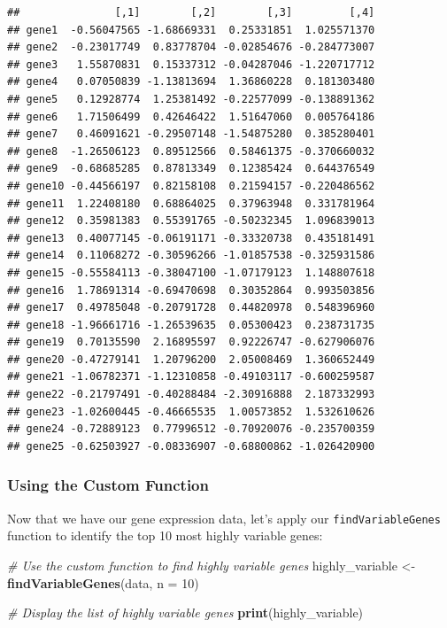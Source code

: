 \documentclass[
]{book}
\newenvironment{Shaded}{\begin{snugshade}}{\end{snugshade}}
\newcommand{\AttributeTok}[1]{\textcolor[rgb]{0.13,0.29,0.53}{#1}}
\newcommand{\CommentTok}[1]{\textcolor[rgb]{0.56,0.35,0.01}{\textit{#1}}}
\newcommand{\DecValTok}[1]{\textcolor[rgb]{0.00,0.00,0.81}{#1}}
\newcommand{\FunctionTok}[1]{\textcolor[rgb]{0.13,0.29,0.53}{\textbf{#1}}}
\newcommand{\NormalTok}[1]{#1}
\newcommand{\OtherTok}[1]{\textcolor[rgb]{0.56,0.35,0.01}{#1}}
\begin{document}
\begin{verbatim}
##               [,1]        [,2]        [,3]         [,4]
## gene1  -0.56047565 -1.68669331  0.25331851  1.025571370
## gene2  -0.23017749  0.83778704 -0.02854676 -0.284773007
## gene3   1.55870831  0.15337312 -0.04287046 -1.220717712
## gene4   0.07050839 -1.13813694  1.36860228  0.181303480
## gene5   0.12928774  1.25381492 -0.22577099 -0.138891362
## gene6   1.71506499  0.42646422  1.51647060  0.005764186
## gene7   0.46091621 -0.29507148 -1.54875280  0.385280401
## gene8  -1.26506123  0.89512566  0.58461375 -0.370660032
## gene9  -0.68685285  0.87813349  0.12385424  0.644376549
## gene10 -0.44566197  0.82158108  0.21594157 -0.220486562
## gene11  1.22408180  0.68864025  0.37963948  0.331781964
## gene12  0.35981383  0.55391765 -0.50232345  1.096839013
## gene13  0.40077145 -0.06191171 -0.33320738  0.435181491
## gene14  0.11068272 -0.30596266 -1.01857538 -0.325931586
## gene15 -0.55584113 -0.38047100 -1.07179123  1.148807618
## gene16  1.78691314 -0.69470698  0.30352864  0.993503856
## gene17  0.49785048 -0.20791728  0.44820978  0.548396960
## gene18 -1.96661716 -1.26539635  0.05300423  0.238731735
## gene19  0.70135590  2.16895597  0.92226747 -0.627906076
## gene20 -0.47279141  1.20796200  2.05008469  1.360652449
## gene21 -1.06782371 -1.12310858 -0.49103117 -0.600259587
## gene22 -0.21797491 -0.40288484 -2.30916888  2.187332993
## gene23 -1.02600445 -0.46665535  1.00573852  1.532610626
## gene24 -0.72889123  0.77996512 -0.70920076 -0.235700359
## gene25 -0.62503927 -0.08336907 -0.68800862 -1.026420900
\end{verbatim}

\hypertarget{using-the-custom-function-1}{%
\subsubsection{Using the Custom Function}\label{using-the-custom-function-1}}

Now that we have our gene expression data, let's apply our \texttt{findVariableGenes} function to identify the top 10 most highly variable genes:

\begin{Shaded}
\begin{Highlighting}[]
\CommentTok{\# Use the custom function to find highly variable genes}
\NormalTok{highly\_variable }\OtherTok{\textless{}{-}} \FunctionTok{findVariableGenes}\NormalTok{(data, }\AttributeTok{n =} \DecValTok{10}\NormalTok{)}

\CommentTok{\# Display the list of highly variable genes}
\FunctionTok{print}\NormalTok{(highly\_variable)}
\end{Highlighting}
\end{Shaded}
\end{document}
